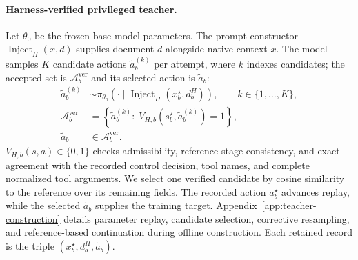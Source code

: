 \documentclass{article}
\begin{document}
\paragraph{Harness-verified privileged teacher.}
Let $\theta_0$ be the frozen base-model parameters. The prompt constructor
$\operatorname{Inject}_H(x,d)$ supplies document $d$ alongside native context
$x$. The model samples $K$ candidate actions $\tilde a_b^{(k)}$ per attempt,
where $k$ indexes candidates; the accepted set is $\mathcal A_b^{\mathrm{ver}}$
and its selected action is $\tilde a_b$:
\begin{equation}
\begin{aligned}
\tilde a_b^{(k)}&\sim\pi_{\theta_0}\!\left(
\cdot\mid\operatorname{Inject}_H(x_b^\star,d_b^H)\right),
\qquad k\in\{1,\ldots,K\},\\
\mathcal A_b^{\mathrm{ver}}&=\left\{
\tilde a_b^{(k)}:\;V_{H,b}(s_b^\star,\tilde a_b^{(k)})=1
\right\},\\
\tilde a_b&\in\mathcal A_b^{\mathrm{ver}}.
\end{aligned}
\label{eq:teacher-sampling}
\end{equation}
$V_{H,b}(s,a)\in\{0,1\}$ checks admissibility, reference-stage consistency,
and exact agreement with the recorded control decision, tool names, and complete
normalized tool arguments. We select one verified candidate by cosine
similarity to the reference over its remaining fields. The recorded action
$a_b^\star$ advances replay, while the selected
$\tilde a_b$ supplies the training target. Appendix~\ref{app:teacher-construction}
details parameter replay, candidate selection, corrective resampling, and
reference-based continuation during offline construction. Each retained record is the triple
$(x_b^\star,d_b^H,\tilde a_b)$.
\end{document}
